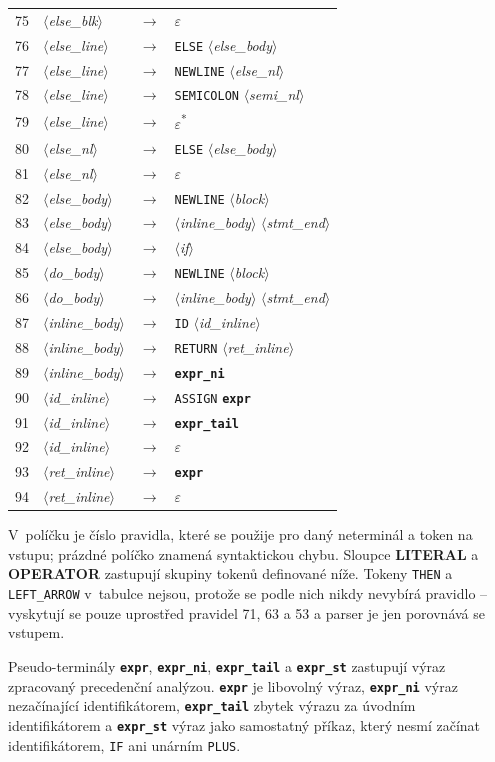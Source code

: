 \documentclass[a4paper,11pt]{article}
\newcommand{\nt}[1]{$\langle$\textit{#1}$\rangle$}   %
\newcommand{\tk}[1]{\texttt{#1}}                     %
\newcommand{\pt}[1]{\texttt{\textbf{#1}}}            %
\newcommand{\grp}[1]{\textsf{\textbf{#1}}}           %
\begin{document}
\begin{longtable}{r l c l}
75 & \nt{else\_blk} & $\rightarrow$ & $\varepsilon$ \\
76 & \nt{else\_line} & $\rightarrow$ & \tk{ELSE} \nt{else\_body} \\
77 & \nt{else\_line} & $\rightarrow$ & \tk{NEWLINE} \nt{else\_nl} \\
78 & \nt{else\_line} & $\rightarrow$ & \tk{SEMICOLON} \nt{semi\_nl} \\
79 & \nt{else\_line} & $\rightarrow$ & $\varepsilon$\textsuperscript{*} \\
80 & \nt{else\_nl} & $\rightarrow$ & \tk{ELSE} \nt{else\_body} \\
81 & \nt{else\_nl} & $\rightarrow$ & $\varepsilon$ \\
82 & \nt{else\_body} & $\rightarrow$ & \tk{NEWLINE} \nt{block} \\
83 & \nt{else\_body} & $\rightarrow$ & \nt{inline\_body} \nt{stmt\_end} \\
84 & \nt{else\_body} & $\rightarrow$ & \nt{if} \\
85 & \nt{do\_body} & $\rightarrow$ & \tk{NEWLINE} \nt{block} \\
86 & \nt{do\_body} & $\rightarrow$ & \nt{inline\_body} \nt{stmt\_end} \\
87 & \nt{inline\_body} & $\rightarrow$ & \tk{ID} \nt{id\_inline} \\
88 & \nt{inline\_body} & $\rightarrow$ & \tk{RETURN} \nt{ret\_inline} \\
89 & \nt{inline\_body} & $\rightarrow$ & \pt{expr\_ni} \\
90 & \nt{id\_inline} & $\rightarrow$ & \tk{ASSIGN} \pt{expr} \\
91 & \nt{id\_inline} & $\rightarrow$ & \pt{expr\_tail} \\
92 & \nt{id\_inline} & $\rightarrow$ & $\varepsilon$ \\
93 & \nt{ret\_inline} & $\rightarrow$ & \pt{expr} \\
94 & \nt{ret\_inline} & $\rightarrow$ & $\varepsilon$ \\
\bottomrule
\end{longtable}
V~políčku je číslo pravidla, které se použije pro daný neterminál a token na vstupu; prázdné políčko znamená syntaktickou chybu. Sloupce \grp{LITERAL} a \grp{OPERATOR} zastupují skupiny tokenů definované níže. Tokeny \tk{THEN} a \tk{LEFT\_ARROW} v~tabulce nejsou, protože se podle nich nikdy nevybírá pravidlo -- vyskytují se pouze uprostřed pravidel 71, 63 a 53 a parser je jen porovnává se vstupem.

Pseudo-terminály \pt{expr}, \pt{expr\_ni}, \pt{expr\_tail} a \pt{expr\_st} zastupují výraz zpracovaný precedenční analýzou. \pt{expr} je libovolný výraz, \pt{expr\_ni} výraz nezačínající identifikátorem, \pt{expr\_tail} zbytek výrazu za úvodním identifikátorem a \pt{expr\_st} výraz jako samostatný příkaz, který nesmí začínat identifikátorem, \tk{IF} ani unárním \tk{PLUS}.
\end{document}
